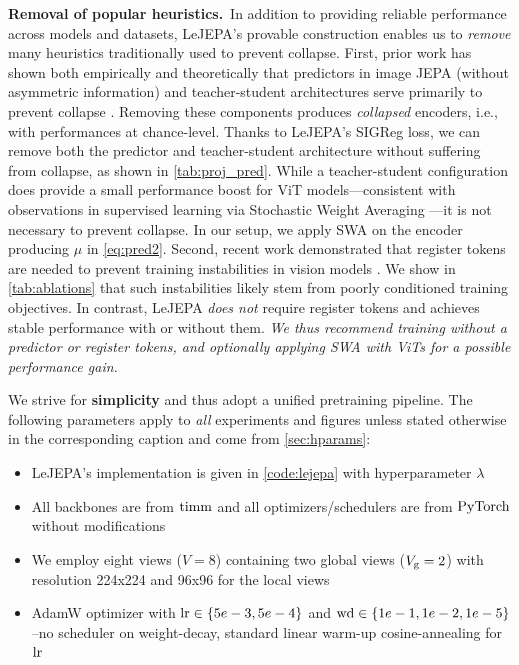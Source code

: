 {\bf Removal of popular heuristics.}~In addition to providing reliable performance across models and datasets, LeJEPA's provable construction enables us to {\em remove} many heuristics traditionally used to prevent collapse. First, prior work has shown both empirically and theoretically that predictors in image JEPA (without asymmetric information) and teacher-student architectures serve primarily to prevent collapse \citep{grill2020bootstrap,jing2021understanding,tian2021understanding,caron2021emerging,chen2021empirical}. Removing these components produces {\em collapsed} encoders, i.e., with performances at chance-level. Thanks to LeJEPA's SIGReg loss, we can remove both the predictor and teacher-student architecture without suffering from collapse, as shown in \cref{tab:proj_pred}. While a teacher-student configuration does provide a small performance boost for ViT models—consistent with observations in supervised learning via Stochastic Weight Averaging \citep{izmailov2019averagingweightsleadswider}—it is not necessary to prevent collapse. In our setup, we apply SWA on the encoder producing $\mu$ in \cref{eq:pred2}. Second, recent work demonstrated that register tokens are needed to prevent training instabilities in vision models \citep{oquab2023dinov2,simeoni2025dinov3,darcet2023vision}. We show in \cref{tab:ablations} that such instabilities likely stem from poorly conditioned training objectives. In contrast, LeJEPA {\em does not} require register tokens and achieves stable performance with or without them. {\em We thus recommend training without a predictor or register tokens, and optionally applying SWA with ViTs for a possible performance gain.}



\begin{detail}[label={def:detail}]{}{}
We strive for {\bf simplicity} and thus adopt a unified pretraining pipeline. The following parameters apply to {\em all} experiments and figures unless stated otherwise in the corresponding caption and come from \cref{sec:hparams}:
\begin{itemize}[nosep,before=\vspace{-0.1em},after=\vspace{-0.4em}]
    \item LeJEPA's implementation is given in \cref{code:lejepa} with hyperparameter $\lambda$ 
    \item All backbones are from ${\rm timm}$ and all optimizers/schedulers are from ${\rm PyTorch}$ without modifications
    \item We employ eight views ($V=8$) containing two global views ($V_{\rm g}=2$) with resolution 224x224 and 96x96 for the local views
    \item AdamW optimizer with ${\rm lr} \in \{5e-3,5e-4\}$ and ${\rm wd} \in \{1e-1,1e-2,1e-5\}$--no scheduler on weight-decay, standard linear warm-up cosine-annealing for ${\rm lr}$
    \end{itemize}
\end{detail}







